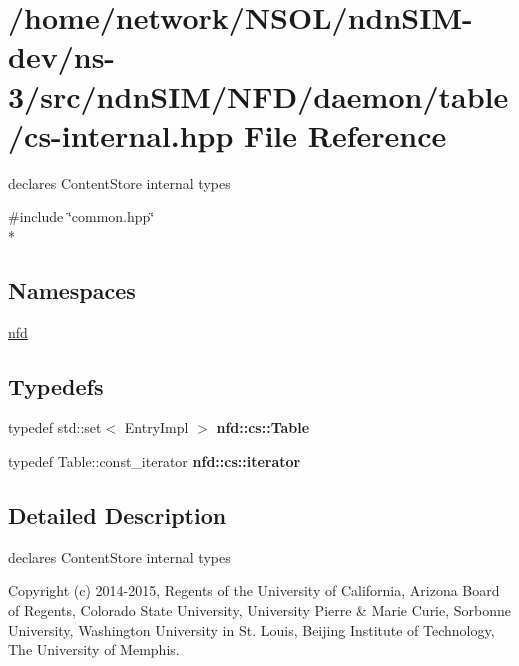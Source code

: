 \hypertarget{cs-internal_8hpp}{}\section{/home/network/\+N\+S\+O\+L/ndn\+S\+I\+M-\/dev/ns-\/3/src/ndn\+S\+I\+M/\+N\+F\+D/daemon/table/cs-\/internal.hpp File Reference}
\label{cs-internal_8hpp}


declares Content\+Store internal types  


{\ttfamily \#include \char`\"{}common.\+hpp\char`\"{}}\\*
\subsection*{Namespaces}
\begin{DoxyCompactItemize}
\item 
 \hyperlink{namespacenfd}{nfd}
\end{DoxyCompactItemize}
\subsection*{Typedefs}
\begin{DoxyCompactItemize}
\item 
typedef std\+::set$<$ Entry\+Impl $>$ {\bfseries nfd\+::cs\+::\+Table}\hypertarget{cs-internal_8hpp_a76de9b330a9deb7d992fed43be2331f0}{}\label{cs-internal_8hpp_a76de9b330a9deb7d992fed43be2331f0}

\item 
typedef Table\+::const\+\_\+iterator {\bfseries nfd\+::cs\+::iterator}\hypertarget{cs-internal_8hpp_a2061c463cd919dbb1fb62bd36d18c96e}{}\label{cs-internal_8hpp_a2061c463cd919dbb1fb62bd36d18c96e}

\end{DoxyCompactItemize}


\subsection{Detailed Description}
declares Content\+Store internal types 

Copyright (c) 2014-\/2015, Regents of the University of California, Arizona Board of Regents, Colorado State University, University Pierre \& Marie Curie, Sorbonne University, Washington University in St. Louis, Beijing Institute of Technology, The University of Memphis.

